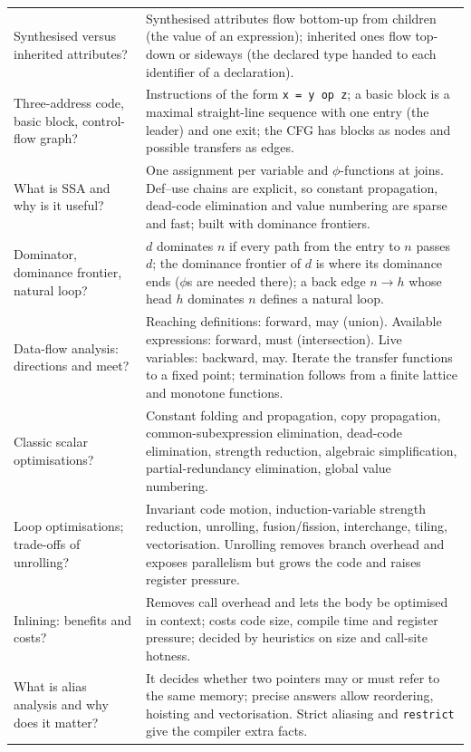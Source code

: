 \documentclass[10pt,a4paper,openany,oneside]{report}
\begin{document}
\begin{center}
\begin{xltabular}{\textwidth}{@{}L{4.6cm}Y@{}}
Synthesised versus inherited attributes? & Synthesised attributes flow bottom-up from children (the value of an expression); inherited ones flow top-down or sideways (the declared type handed to each identifier of a declaration).\\
Three-address code, basic block, control-flow graph? & Instructions of the form \texttt{x = y op z}; a basic block is a maximal straight-line sequence with one entry (the leader) and one exit; the CFG has blocks as nodes and possible transfers as edges.\\
What is SSA and why is it useful? & One assignment per variable and $\phi$-functions at joins. Def--use chains are explicit, so constant propagation, dead-code elimination and value numbering are sparse and fast; built with dominance frontiers.\\
Dominator, dominance frontier, natural loop? & $d$ dominates $n$ if every path from the entry to $n$ passes $d$; the dominance frontier of $d$ is where its dominance ends ($\phi$s are needed there); a back edge $n\to h$ whose head $h$ dominates $n$ defines a natural loop.\\
Data-flow analysis: directions and meet? & Reaching definitions: forward, may (union). Available expressions: forward, must (intersection). Live variables: backward, may. Iterate the transfer functions to a fixed point; termination follows from a finite lattice and monotone functions.\\
Classic scalar optimisations? & Constant folding and propagation, copy propagation, common-subexpression elimination, dead-code elimination, strength reduction, algebraic simplification, partial-redundancy elimination, global value numbering.\\
Loop optimisations; trade-offs of unrolling? & Invariant code motion, induction-variable strength reduction, unrolling, fusion/fission, interchange, tiling, vectorisation. Unrolling removes branch overhead and exposes parallelism but grows the code and raises register pressure.\\
Inlining: benefits and costs? & Removes call overhead and lets the body be optimised in context; costs code size, compile time and register pressure; decided by heuristics on size and call-site hotness.\\
What is alias analysis and why does it matter? & It decides whether two pointers may or must refer to the same memory; precise answers allow reordering, hoisting and vectorisation. Strict aliasing and \texttt{restrict} give the compiler extra facts.\\

\end{xltabular}
\end{center}
\end{document}
